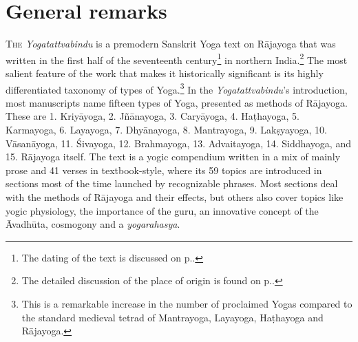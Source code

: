 \section{General remarks}
\label{generalremarks}
\lettrine[lines=2, lhang=0.2, loversize=0.25]{T}{he} \textit{Yogatattvabindu} is a premodern Sanskrit Yoga text on Rājayoga that was written in the first half of the seventeenth century\footnote{The dating of the text is discussed on p.\pageref{dating}.} in northern India.\footnote{The detailed discussion of the place of origin is found on p.\pageref{placeoforigin}.} The most salient feature of the work that makes it historically significant is its highly differentiated taxonomy of types of Yoga.\footnote{This is a remarkable increase in the number of proclaimed Yogas compared to the standard medieval tetrad of Mantrayoga, Layayoga, Haṭhayoga and Rājayoga.} In the \textit{Yogatattvabindu}'s introduction, most manuscripts name fifteen types of Yoga, presented as methods of Rājayoga. These are 1. Kriyāyoga, 2. Jñānayoga, 3. Caryāyoga, 4. Haṭhayoga, 5. Karmayoga, 6. Layayoga, 7. Dhyānayoga, 8. Mantrayoga, 9. Lakṣyayoga, 10. Vāsanāyoga, 11. Śivayoga, 12. Brahmayoga, 13. Advaitayoga, 14. Siddhayoga, and 15. Rājayoga itself. The text is a yogic compendium written in a mix of mainly prose and 41 verses in textbook-style, where its 59 topics are introduced in sections most of the time launched by recognizable phrases. Most sections deal with the methods of Rājayoga and their effects, but others also cover topics like yogic physiology, the importance of the guru, an innovative concept of the Āvadhūta, cosmogony and a \textit{yogarahasya}.  

